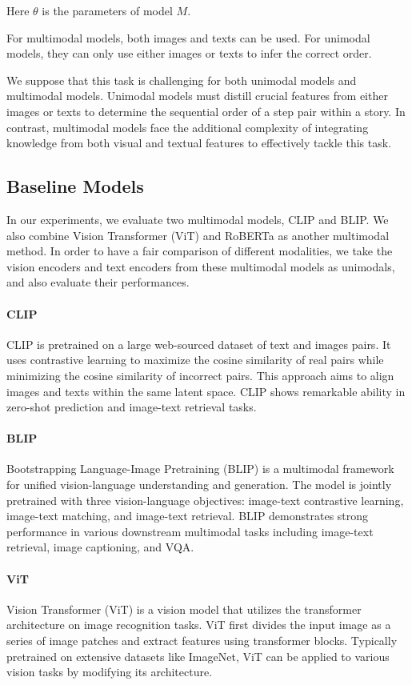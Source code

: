 \documentclass[11pt]{article}
\begin{document}
Here $\theta$ is the parameters of model $M$.

For multimodal models, both images and texts can be used. For unimodal models, they can only use either images or texts to infer the correct order.

We suppose that this task is challenging for both unimodal models and multimodal models. Unimodal models must distill crucial features from either images or texts to determine the sequential order of a step pair within a story. In contrast, multimodal models face the additional complexity of integrating knowledge from both visual and textual features to effectively tackle this task.


\subsection{Baseline Models}
In our experiments, we evaluate two multimodal models, CLIP\citep{radford2021learning} and BLIP\cite{li2022blip}. We also combine Vision Transformer (ViT)\citep{dosovitskiy2020image} and RoBERTa\citep{liu2019roberta} as another multimodal method. In order to have a fair comparison of different modalities, we take the vision encoders and text encoders from these multimodal models as unimodals, and also evaluate their performances.

\paragraph*{CLIP}
CLIP is pretrained on a large web-sourced dataset of text and images pairs. It uses contrastive learning to maximize the cosine similarity of real pairs while minimizing the cosine similarity of incorrect pairs. This approach aims to align images and texts within the same latent space. CLIP shows remarkable ability in zero-shot prediction and image-text retrieval tasks.

\paragraph*{BLIP}
Bootstrapping Language-Image Pretraining (BLIP) is a multimodal framework for unified vision-language understanding and generation. The model is jointly pretrained with three vision-language objectives: image-text contrastive learning, image-text matching, and image-text retrieval. BLIP demonstrates strong performance in various downstream multimodal tasks including image-text retrieval, image captioning, and VQA. 

\paragraph*{ViT}
Vision Transformer (ViT) is a vision model that utilizes the transformer architecture on image recognition tasks. ViT first divides the input image as a series of image patches and extract features using transformer blocks. Typically pretrained on extensive datasets like ImageNet, ViT can be applied to various vision tasks by modifying its architecture.
\end{document}

